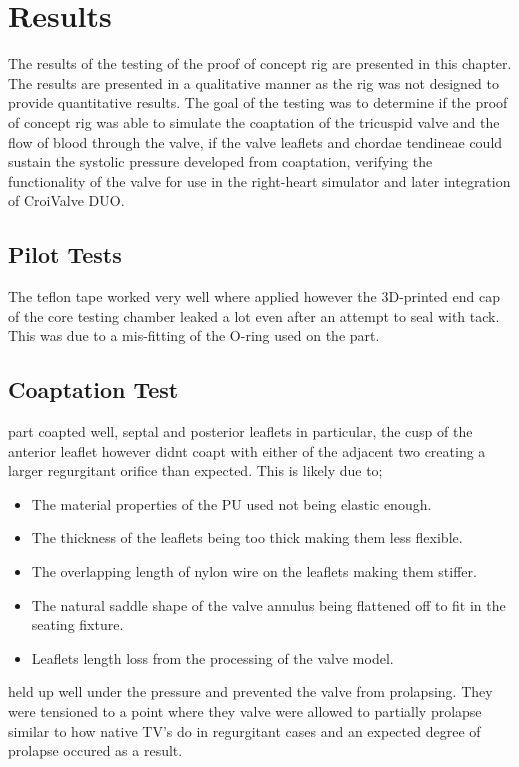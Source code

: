 \chapter{Results}\label{ch:results}
The results of the testing of the proof of concept rig are presented in this chapter. The results are presented in a qualitative manner as the rig was not designed to provide quantitative results.
The goal of the testing was to determine if the proof of concept rig was able to simulate the coaptation of the tricuspid valve and the flow of blood through the valve, if the valve leaflets and chordae tendineae could sustain the systolic pressure developed from coaptation, verifying the functionality of the valve for use in the right-heart simulator and later integration of CroiValve DUO.

\section{Pilot Tests}
The teflon tape worked very well where applied however the 3D-printed end cap of the core testing chamber leaked a lot even after an attempt to seal with tack. This was due to a mis-fitting of the O-ring used on the part.

\section{Coaptation Test}
 part coapted well, septal and posterior leaflets in particular, the cusp of the anterior leaflet however didnt coapt with either of the adjacent two creating a larger regurgitant orifice than expected. This is likely due to;
\begin{itemize}
    \item The material properties of the \gls{PU} used not being elastic enough.
    \item The thickness of the leaflets being too thick making them less flexible.
    \item The overlapping length of nylon wire on the leaflets making them stiffer.
    \item The natural saddle shape of the valve annulus being flattened off to fit in the seating fixture.
    \item Leaflets length loss from the processing of the valve model.
\end{itemize}

 held up well under the pressure and prevented the valve from prolapsing. They were tensioned to a point where they valve were allowed to partially prolapse similar to how native \gls{TV}'s do in regurgitant cases and an expected degree of prolapse occured as a result.


